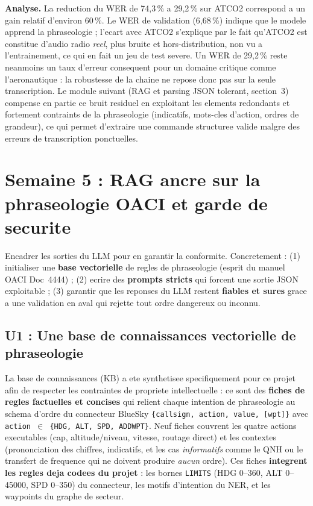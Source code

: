 \documentclass[11pt,a4paper]{article}
\begin{document}
\noindent\textbf{Analyse.} La reduction du WER de 74,3\,\% a 29,2\,\% sur ATCO2
correspond a un gain relatif d'environ 60\,\%. Le WER de validation (6,68\,\%)
indique que le modele apprend la phraseologie ; l'ecart avec ATCO2 s'explique par
le fait qu'ATCO2 est constitue d'audio radio \emph{reel}, plus bruite et
hors-distribution, non vu a l'entrainement, ce qui en fait un jeu de test severe.
Un WER de 29,2\,\% reste neanmoins un taux d'erreur consequent pour un domaine
critique comme l'aeronautique : la robustesse de la chaine ne repose donc pas sur
la seule transcription. Le module suivant (RAG et parsing JSON tolerant, section~3)
compense en partie ce bruit residuel en exploitant les elements redondants et
fortement contraints de la phraseologie (indicatifs, mots-cles d'action, ordres de
grandeur), ce qui permet d'extraire une commande structuree valide malgre des
erreurs de transcription ponctuelles.

\section{Semaine 5 : RAG ancre sur la phraseologie OACI et garde de securite}

\begin{objbox}
Encadrer les sorties du LLM pour en garantir la conformite. Concretement : (1) initialiser une
\textbf{base vectorielle} de regles de phraseologie (esprit du manuel OACI
Doc~4444) ; (2) ecrire des \textbf{prompts stricts} qui forcent une sortie JSON
exploitable ; (3) garantir que les reponses du LLM restent \textbf{fiables et
sures} grace a une validation en aval qui rejette tout ordre dangereux ou inconnu.
\end{objbox}

\subsection{U1 : Une base de connaissances vectorielle de phraseologie}

La base de connaissances (KB) a ete synthetisee specifiquement pour ce projet afin
de respecter les contraintes de propriete intellectuelle : ce sont des
\textbf{fiches de regles factuelles et concises} qui relient chaque intention de
phraseologie au schema d'ordre du
connecteur BlueSky \texttt{\{callsign, action, value, [wpt]\}} avec
\texttt{action $\in$ \{HDG, ALT, SPD, ADDWPT\}}. Neuf fiches couvrent les quatre
actions executables (cap, altitude/niveau, vitesse, routage direct) et les
contextes (prononciation des chiffres, indicatifs, et les cas \emph{informatifs}
comme le QNH ou le transfert de frequence qui ne doivent produire \emph{aucun}
ordre). Ces fiches \textbf{integrent les regles deja codees du projet} : les bornes
\texttt{LIMITS} (HDG 0--360, ALT 0--45000, SPD 0--350) du connecteur, les motifs
d'intention du NER, et les waypoints du graphe de secteur.
\end{document}
